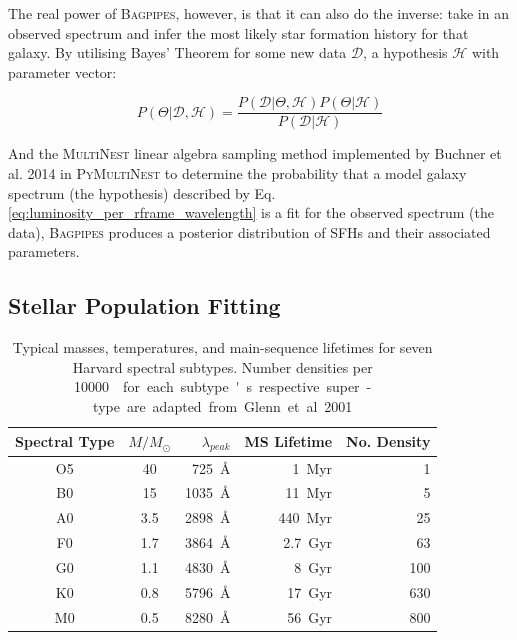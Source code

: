 \documentclass[a4paper,11pt]{article}
\begin{document}
The real power of \textsc{Bagpipes}, however, is that it can also do the inverse: take in an observed spectrum and infer the most likely star formation history for that galaxy. By utilising Bayes' Theorem for some new data $\mathcal{D}$, a hypothesis $\mathcal{H}$ with parameter vector:

\begin{equation}\label{eq:bayes_theorem}
  P(\Theta|\mathcal{D},\mathcal{H}) =
  \frac
  {P(\mathcal{D}|\Theta,\mathcal{H})P(\Theta|\mathcal{H})}
  {P(\mathcal{D}|\mathcal{H})}
\end{equation}

\noindent And the \textsc{MultiNest} linear algebra sampling method implemented by Buchner et al. 2014 in \textsc{PyMultiNest} to determine the probability that a model galaxy spectrum (the hypothesis) described by Eq. \ref{eq:luminosity_per_rframe_wavelength} is a fit for the observed spectrum (the data), \textsc{Bagpipes} produces a posterior distribution of SFHs and their associated parameters.\cite{Carnall_2018, Buchner_2014}

\subsection{Stellar Population Fitting}\label{sec:stellar_population_fitting}

\begin{table}
  \centering
  \begin{tabular}{c c r r r}
    Spectral Type & $M/M_\odot$ & $\lambda_{peak}$     & MS Lifetime   & No. Density \\
    \hline \hline
    O5            &	40          & \SI{725}{\angstrom}  & \SI{1}{Myr}   & 1           \\
    B0            &	15          & \SI{1035}{\angstrom} & \SI{11}{Myr}  & 5           \\
    A0            &	3.5         & \SI{2898}{\angstrom} & \SI{440}{Myr} & 25          \\
    F0            &	1.7         & \SI{3864}{\angstrom} & \SI{2.7}{Gyr} & 63          \\
    G0            &	1.1         & \SI{4830}{\angstrom} & \SI{8}{Gyr}   & 100         \\
    K0            &	0.8         & \SI{5796}{\angstrom} & \SI{17}{Gyr}  & 630         \\
    M0            &	0.5         & \SI{8280}{\angstrom} & \SI{56}{Gyr}  & 800         \\
    \hline
  \end{tabular}
  \caption{Typical masses, temperatures, and main-sequence lifetimes for seven Harvard spectral subtypes. Number densities per \SI{10000}{\cubic\parsec} for each subtype's respective super-type are adapted from Glenn et al. 2001.\cite{Glenn_2001}}
  \label{tab:star_lifetimes_densities}
\end{table}
\end{document}
